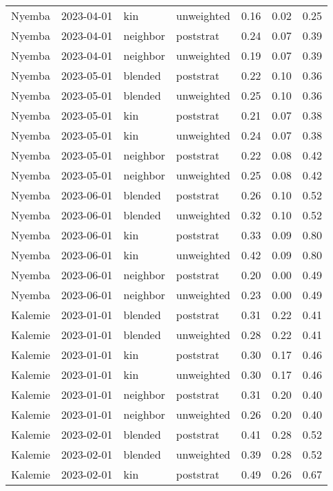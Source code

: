 \begin{table}[ht]
\begin{tabular}{llllrrr}
  Nyemba & 2023-04-01 & kin & unweighted & 0.16 & 0.02 & 0.25 \\ 
  Nyemba & 2023-04-01 & neighbor & poststrat & 0.24 & 0.07 & 0.39 \\ 
  Nyemba & 2023-04-01 & neighbor & unweighted & 0.19 & 0.07 & 0.39 \\ 
  Nyemba & 2023-05-01 & blended & poststrat & 0.22 & 0.10 & 0.36 \\ 
  Nyemba & 2023-05-01 & blended & unweighted & 0.25 & 0.10 & 0.36 \\ 
  Nyemba & 2023-05-01 & kin & poststrat & 0.21 & 0.07 & 0.38 \\ 
  Nyemba & 2023-05-01 & kin & unweighted & 0.24 & 0.07 & 0.38 \\ 
  Nyemba & 2023-05-01 & neighbor & poststrat & 0.22 & 0.08 & 0.42 \\ 
  Nyemba & 2023-05-01 & neighbor & unweighted & 0.25 & 0.08 & 0.42 \\ 
  Nyemba & 2023-06-01 & blended & poststrat & 0.26 & 0.10 & 0.52 \\ 
  Nyemba & 2023-06-01 & blended & unweighted & 0.32 & 0.10 & 0.52 \\ 
  Nyemba & 2023-06-01 & kin & poststrat & 0.33 & 0.09 & 0.80 \\ 
  Nyemba & 2023-06-01 & kin & unweighted & 0.42 & 0.09 & 0.80 \\ 
  Nyemba & 2023-06-01 & neighbor & poststrat & 0.20 & 0.00 & 0.49 \\ 
  Nyemba & 2023-06-01 & neighbor & unweighted & 0.23 & 0.00 & 0.49 \\ 
  Kalemie & 2023-01-01 & blended & poststrat & 0.31 & 0.22 & 0.41 \\ 
  Kalemie & 2023-01-01 & blended & unweighted & 0.28 & 0.22 & 0.41 \\ 
  Kalemie & 2023-01-01 & kin & poststrat & 0.30 & 0.17 & 0.46 \\ 
  Kalemie & 2023-01-01 & kin & unweighted & 0.30 & 0.17 & 0.46 \\ 
  Kalemie & 2023-01-01 & neighbor & poststrat & 0.31 & 0.20 & 0.40 \\ 
  Kalemie & 2023-01-01 & neighbor & unweighted & 0.26 & 0.20 & 0.40 \\ 
  Kalemie & 2023-02-01 & blended & poststrat & 0.41 & 0.28 & 0.52 \\ 
  Kalemie & 2023-02-01 & blended & unweighted & 0.39 & 0.28 & 0.52 \\ 
  Kalemie & 2023-02-01 & kin & poststrat & 0.49 & 0.26 & 0.67 \\ 

\end{tabular}
\end{table}
